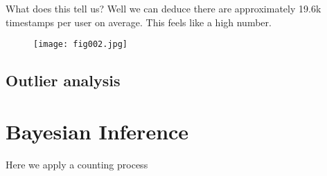 What does this tell us? Well we can deduce there are approximately 19.6k timestamps per user on average. This feels like a high number.

\begin{figure}[h!]
	\centering
	\texttt{[image: fig002.jpg]}
	\caption{}
	\label{fig:fig2}
\end{figure} 


\subsection{Outlier analysis} 


\section{Bayesian Inference}

Here we apply a counting process 